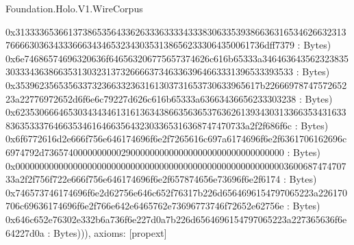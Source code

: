 \begin{lexlean}{Foundation.Holo.V1.WireCorpus}
\begin{semanticmodule}
{0x313333653661373865356433626333633334333830633539386636316534626632313766663036343336663434653234303531386562333064350061736dff7379 : Bytes) 0x6e74686574696320636f646563206775657374626c616b65333a346463643562323835303334363866353130323137326666373463363964663331396533393533 : Bytes) 0x353962356535633732366332363161303731653730633965617b2266697874757265223a22776972652d6f6e6c79227d626c616b65333a63663436656233303238 : Bytes) 0x62353066646530343434613161363438663563653763626139343031336635343163383635333764663534616466356432303365316368747470733a2f2f686f6c : Bytes) 0x6f6772616d2e666f756e646174696f6e2f7265616c697a6174696f6e2f6361706162696c6974792d73657400000000002900000000000000000000000000000000 : Bytes) 0x00000000000000000000000000000000000000000000000000000000360068747470733a2f2f756f722e666f756e646174696f6e2f657874656e73696f6e2f6174 : Bytes) 0x746573746174696f6e2d62756e646c652f76317b226d6564696154797065223a226170706c69636174696f6e2f766e642e6465762e73696773746f72652e62756e : Bytes) 0x646c652e76302e332b6a736f6e227d0a7b226d6564696154797065223a227365636f6e64227d0a : Bytes))),
  axioms: [propext]
}


\end{semanticmodule}
\end{lexlean}
